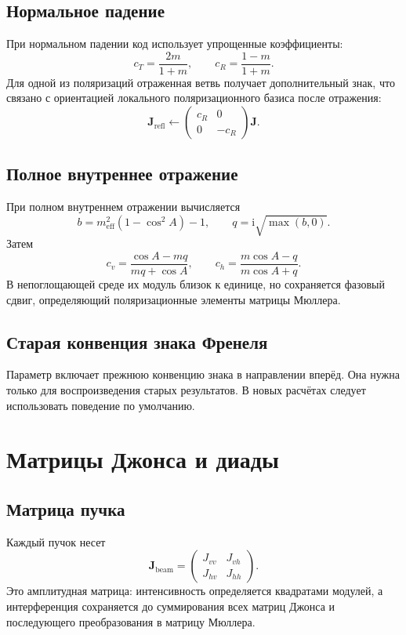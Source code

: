 \documentclass[11pt,a4paper]{article}
\newcommand{\code}[1]{\texttt{\small\detokenize{#1}}}
\newcommand{\matr}[1]{\symbf{#1}}
\newcommand{\ii}{\mathrm{i}}
\begin{document}
\subsection{Нормальное падение}

При нормальном падении код использует упрощенные коэффициенты:
\[
  c_T=\frac{2m}{1+m},\qquad
  c_R=\frac{1-m}{1+m}.
\]
Для одной из поляризаций отраженная ветвь получает дополнительный знак, что связано с ориентацией локального поляризационного базиса после отражения:
\[
  \matr J_{\mathrm{refl}}
  \leftarrow
  \begin{pmatrix}
  c_R&0\\0&-c_R
  \end{pmatrix}\matr J.
\]

\subsection{Полное внутреннее отражение}

При полном внутреннем отражении вычисляется
\[
  b = m_{\mathrm{eff}}^2(1-\cos^2 A)-1,\qquad
  q=\ii\sqrt{\max(b,0)}.
\]
Затем
\[
  c_v=\frac{\cos A-mq}{mq+\cos A},\qquad
  c_h=\frac{m\cos A-q}{m\cos A+q}.
\]
В непоглощающей среде их модуль близок к единице, но сохраняется фазовый
сдвиг, определяющий поляризационные элементы матрицы Мюллера.

\subsection{Старая конвенция знака Френеля}

Параметр \code{--legacy-sign} включает прежнюю конвенцию знака в направлении
вперёд. Она нужна только для воспроизведения старых результатов. В новых
расчётах следует использовать поведение по умолчанию.

\section{Матрицы Джонса и диады}

\subsection{Матрица пучка}

Каждый пучок несет
\[
\matr J_{\mathrm{beam}}=
\begin{pmatrix}
J_{vv}&J_{vh}\\
J_{hv}&J_{hh}
\end{pmatrix}.
\]
Это амплитудная матрица: интенсивность определяется квадратами модулей, а
интерференция сохраняется до суммирования всех матриц Джонса и последующего
преобразования в матрицу Мюллера.
\end{document}
